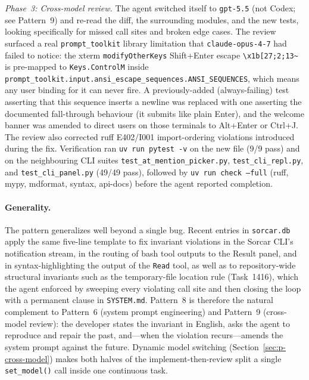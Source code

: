 \documentclass{article}
\begin{document}
\begin{sloppypar}
\emph{Phase~3: Cross-model review.}
The agent switched itself to \texttt{gpt-5.5} (not Codex; see
Pattern~9) and re-read the diff, the surrounding modules, and the
new tests, looking specifically for missed call sites and broken edge
cases.  The review surfaced a real \texttt{prompt\_toolkit} library
limitation that \texttt{claude-opus-4-7} had failed to notice: the
xterm \texttt{modifyOtherKeys} Shift+Enter escape
\texttt{\textbackslash x1b[27;2;13\textasciitilde} is pre-mapped to
\texttt{Keys.ControlM} inside
\texttt{prompt\_toolkit.\allowbreak input.\allowbreak ansi\_escape\_sequences.\allowbreak ANSI\_SEQUENCES},
which means any user binding for it can never fire.  A
previously-added (always-failing) test asserting that this sequence
inserts a newline was replaced with one asserting the documented
fall-through behaviour (it submits like plain Enter), and the
welcome banner was amended to direct users on those terminals to
Alt+Enter or Ctrl+J.  The review also corrected ruff E402/I001
import-ordering violations introduced during the fix.  Verification
ran \texttt{uv run pytest -v} on the new file (9/9 pass) and on the
neighbouring CLI suites \texttt{test\_at\_mention\_picker.py},
\texttt{test\_cli\_repl.py}, and \texttt{test\_cli\_panel.py} (49/49
pass), followed by \texttt{uv run check --full} (ruff, mypy,
mdformat, syntax, api-docs) before the agent reported completion.
\end{sloppypar}

\paragraph{Generality.}
The pattern generalizes well beyond a single bug.  Recent entries in
\texttt{sorcar.db} apply the same five-line template to fix
invariant violations in the Sorcar CLI's notification stream, in the
routing of bash tool outputs to the Result panel, and in
syntax-highlighting the output of the \texttt{Read} tool, as well as
to repository-wide structural invariants such as the temporary-file
location rule (Task~1416), which the agent enforced by sweeping every
violating call site and then closing the loop with a permanent clause
in \texttt{SYSTEM.md}.
Pattern~8 is therefore the natural complement to Pattern~6 (system
prompt engineering) and Pattern~9 (cross-model review): the developer
states the invariant in English, asks the agent to reproduce and
repair the past, and---when the violation recurs---amends the system
prompt against the future.  Dynamic model switching
(Section~\ref{sec:p-cross-model}) makes both halves of the
implement-then-review split a single \texttt{set\_model()} call
inside one continuous task.
\end{document}
